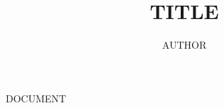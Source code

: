 \documentclass[11pt,twoside]{article}
\author{AUTHOR}
\title{TITLE}
\begin{document}
DOCUMENT
\end{document}
